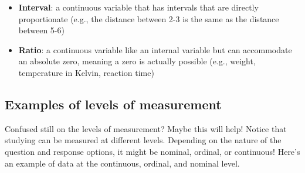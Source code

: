 \documentclass[
]{book}
\begin{document}
\begin{itemize}
\item
  \textbf{Interval}: a continuous variable that has intervals that are directly proportionate (e.g., the distance between 2-3 is the same as the distance between 5-6)
\item
  \textbf{Ratio}: a continuous variable like an internal variable but can accommodate an absolute zero, meaning a zero is actually possible (e.g., weight, temperature in Kelvin, reaction time)
\end{itemize}

\hypertarget{examples-of-levels-of-measurement}{%
\subsection{Examples of levels of measurement}\label{examples-of-levels-of-measurement}}

Confused still on the levels of measurement? Maybe this will help! Notice that studying can be measured at different levels. Depending on the nature of the question and response options, it might be nominal, ordinal, or continuous! Here's an example of data at the continuous, ordinal, and nominal level.
\end{document}
